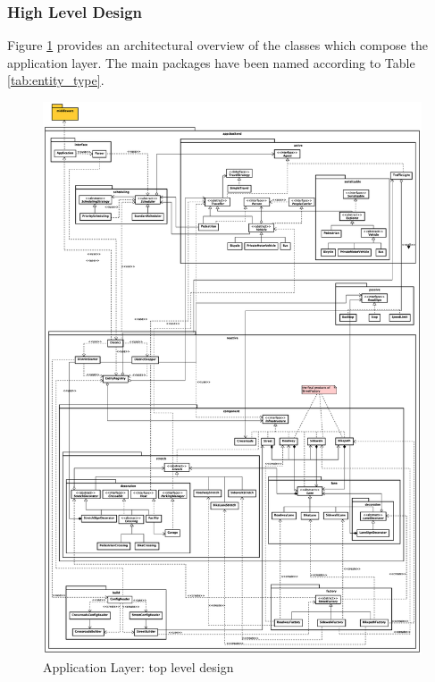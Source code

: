 \subsubsection{High Level Design}


Figure \ref{fig:sd-app-backend-architecture} provides an architectural overview
of the classes which compose the application layer.
The main packages have been named according to Table \ref{tab:entity_type}.

\begin{figure}[H]
  \centering
  \includegraphics[width=.95\columnwidth]{images/solution/app/backend/app_backend_architecture.eps}
  \caption{Application Layer: top level design}
  \label{fig:sd-app-backend-architecture}
\end{figure}


